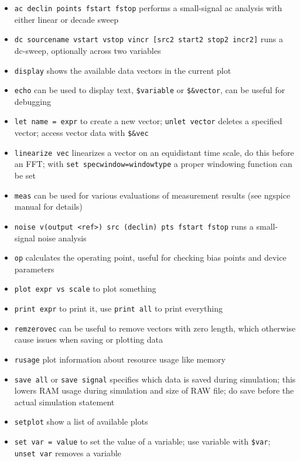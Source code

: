 \documentclass[
  a4paper,
  DIV=11,
  numbers=noendperiod]{scrartcl}
\providecommand{\tightlist}{%
  \setlength{\itemsep}{0pt}\setlength{\parskip}{0pt}}\usepackage{longtable,booktabs,array}
\begin{document}
\begin{itemize}
\tightlist
\item
  \texttt{ac\ dec\textbar{}lin\ points\ fstart\ fstop} performs a
  small-signal ac analysis with either linear or decade sweep
\item
  \texttt{dc\ sourcename\ vstart\ vstop\ vincr\ {[}src2\ start2\ stop2\ incr2{]}}
  runs a dc-sweep, optionally across two variables
\item
  \texttt{display} shows the available data vectors in the current plot
\item
  \texttt{echo} can be used to display text, \texttt{\$variable} or
  \texttt{\$\&vector}, can be useful for debugging
\item
  \texttt{let\ name\ =\ expr} to create a new vector;
  \texttt{unlet\ vector} deletes a specified vector; access vector data
  with \texttt{\$\&vec}
\item
  \texttt{linearize\ vec} linearizes a vector on an equidistant time
  scale, do this before an FFT; with \texttt{set\ specwindow=windowtype}
  a proper windowing function can be set
\item
  \texttt{meas} can be used for various evaluations of measurement
  results (see ngspice manual for details)
\item
  \texttt{noise\ v(output\ \textless{}ref\textgreater{})\ src\ (dec\textbar{}lin)\ pts\ fstart\ fstop}
  runs a small-signal noise analysis
\item
  \texttt{op} calculates the operating point, useful for checking bias
  points and device parameters
\item
  \texttt{plot\ expr\ vs\ scale} to plot something
\item
  \texttt{print\ expr} to print it, use \texttt{print\ all} to print
  everything
\item
  \texttt{remzerovec} can be useful to remove vectors with zero length,
  which otherwise cause issues when saving or plotting data
\item
  \texttt{rusage} plot information about resource usage like memory
\item
  \texttt{save\ all} or \texttt{save\ signal} specifies which data is
  saved during simulation; this lowers RAM usage during simulation and
  size of RAW file; do save before the actual simulation statement
\item
  \texttt{setplot} show a list of available plots
\item
  \texttt{set\ var\ =\ value} to set the value of a variable; use
  variable with \texttt{\$var}; \texttt{unset\ var} removes a variable

\end{itemize}
\end{document}
